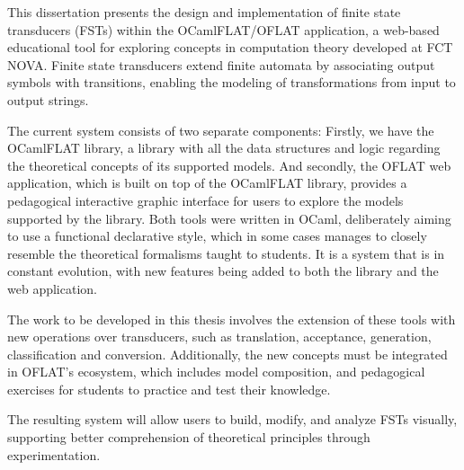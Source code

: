 
%

This dissertation presents the design and implementation of finite state transducers (FSTs) within the OCamlFLAT/OFLAT application, 
a web-based educational tool for exploring concepts in computation theory developed at FCT NOVA. 
Finite state transducers extend finite automata by associating output symbols with transitions, 
enabling the modeling of transformations from input to output strings. 

The current system consists of two separate components:
Firstly, we have the OCamlFLAT library, a library with all the data structures and logic regarding the theoretical concepts of its supported models.
And secondly, the OFLAT web application, which is built on top of the OCamlFLAT library, provides a pedagogical interactive graphic interface 
for users to explore the models supported by the library.
Both tools were written in OCaml, deliberately aiming to use a functional declarative style, 
which in some cases manages to closely resemble the theoretical formalisms taught to students.
It is a system that is in constant evolution, with new features being added to both the library and the web application.

The work to be developed in this thesis involves the extension of these tools with new operations over transducers, 
such as translation, acceptance, generation, classification and conversion.
Additionally, the new concepts must be integrated in OFLAT's ecosystem, which includes model composition,
and pedagogical exercises for students to practice and test their knowledge.

The resulting system will allow users to build, modify, and analyze FSTs visually, 
supporting better comprehension of theoretical principles through experimentation.
